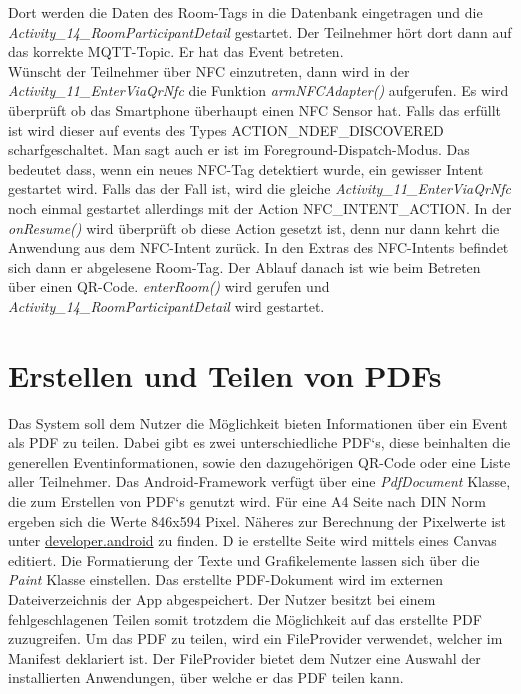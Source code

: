 Dort werden die Daten des Room-Tags in die Datenbank eingetragen und die \textit{Activity\_14\_RoomParticipantDetail} gestartet. Der Teilnehmer hört dort dann auf das korrekte MQTT-Topic. Er hat das Event betreten.\\
Wünscht der Teilnehmer über NFC einzutreten, dann wird in der \textit{Activity\_11\_EnterViaQrNfc} die Funktion \textit{armNFCAdapter()} aufgerufen. Es wird überprüft ob das Smartphone überhaupt einen NFC Sensor hat.
Falls das erfüllt ist wird dieser auf events des Types ACTION\_NDEF\_DISCOVERED scharfgeschaltet. 
Man sagt auch er ist im Foreground-Dispatch-Modus.
Das bedeutet dass, wenn ein neues NFC-Tag detektiert wurde, ein gewisser Intent gestartet wird. 
Falls das der Fall ist, wird die gleiche \textit{Activity\_11\_EnterViaQrNfc} noch einmal gestartet allerdings mit der Action NFC\_INTENT\_ACTION. 
In der \textit{onResume()} wird überprüft ob diese Action gesetzt ist, denn nur dann kehrt die Anwendung aus dem NFC-Intent zurück.
In den Extras des NFC-Intents befindet sich dann er abgelesene Room-Tag. Der Ablauf danach ist wie beim Betreten über einen QR-Code. \textit{enterRoom()} wird gerufen und \textit{Activity\_14\_RoomParticipantDetail} wird gestartet.




\section{Erstellen und Teilen von PDFs}
\label{sec:PDF}
Das System soll dem Nutzer die Möglichkeit bieten Informationen über ein Event als PDF zu teilen. 
Dabei gibt es zwei unterschiedliche PDF‘s, diese beinhalten die generellen Eventinformationen, sowie den dazugehörigen QR-Code oder eine Liste aller Teilnehmer.
Das Android-Framework  verfügt über eine \textit{PdfDocument} Klasse, die zum Erstellen von PDF‘s genutzt wird. 
Für eine A4 Seite nach DIN Norm ergeben sich die Werte 846x594 Pixel. Näheres zur Berechnung der Pixelwerte ist unter \href{https://developer.android.com/reference/android/graphics/pdf/PdfDocument.PageInfo}{developer.android} zu finden. D
ie erstellte Seite wird mittels eines Canvas editiert. 
Die Formatierung  der Texte und Grafikelemente lassen sich über die \textit{Paint} Klasse einstellen.
Das erstellte PDF-Dokument wird im externen Dateiverzeichnis der App abgespeichert. Der Nutzer besitzt bei einem fehlgeschlagenen Teilen somit trotzdem die Möglichkeit auf das erstellte PDF zuzugreifen.
Um das PDF zu teilen, wird ein FileProvider verwendet, welcher im Manifest deklariert ist.  Der FileProvider bietet dem Nutzer eine Auswahl der installierten Anwendungen, über welche er das PDF teilen kann.



